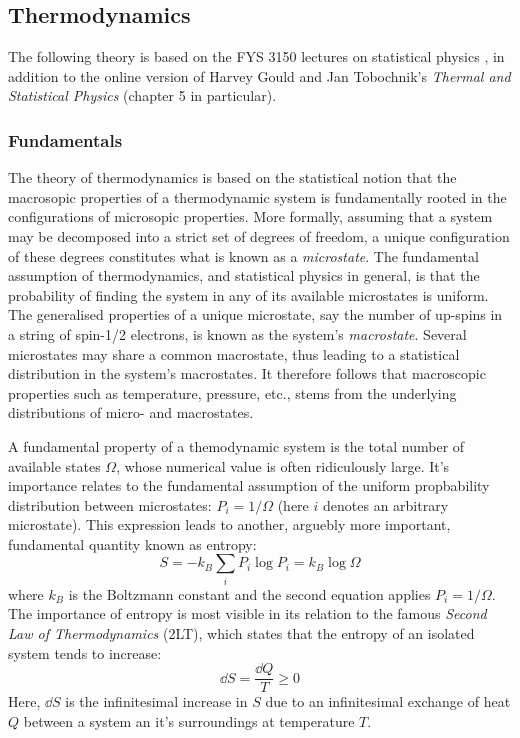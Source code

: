 \documentclass[nofootinbib,reprint,english]{revtex4-1}
\begin{document}
\subsection{Thermodynamics}
The following theory is based on the FYS 3150 lectures on statistical physics \cite{statphys}, in addition to the online version of Harvey Gould and Jan Tobochnik's \emph{Thermal and Statistical Physics} \cite{thermal_and_stat} (chapter 5 in particular).
\subsubsection{Fundamentals}
The theory of thermodynamics is based on the statistical notion that the macrosopic properties of a thermodynamic system is fundamentally rooted in the configurations of microsopic properties. More formally, assuming that a system may be decomposed into a strict set of degrees of freedom, a unique configuration of these degrees constitutes what is known as a \emph{microstate}. The fundamental assumption of thermodynamics, and statistical physics in general, is that the probability of finding the system in any of its available microstates is uniform. The generalised properties of a unique microstate, say the number of up-spins in a string of spin-1/2 electrons, is known as the system's \emph{macrostate}. Several microstates may share a common macrostate, thus leading to a statistical distribution in the system's macrostates. It therefore follows that macroscopic properties such as temperature, pressure, etc., stems from the underlying distributions of micro- and macrostates.

A fundamental property of a themodynamic system is the total number of available states \(\Omega\), whose numerical value is often ridiculously large.  It's importance relates to the fundamental assumption of the uniform propbability distribution between microstates: \(P_i=1/\Omega\) (here \(i\) denotes an arbitrary microstate). This expression leads to another, arguebly more important, fundamental quantity known as entropy:
\begin{equation}\label{eq:Entropy}
S=-k_B\sum_iP_i\log P_i=k_B\log\Omega
\end{equation}
where \(k_B\) is the Boltzmann constant and the second equation applies \(P_i=1/\Omega\). The importance of entropy is most visible in its relation to the famous \emph{Second Law of Thermodynamics} (2LT), which states that the entropy of an isolated system tends to increase:
\begin{equation}\label{eq:Second_Law_of_Thermodynamics}
\dd{S}=\frac{\dd{Q}}{T}\geq0
\end{equation}
Here, \(\dd{S}\) is the infinitesimal increase in \(S\) due to an infinitesimal exchange of heat \(Q\) between a system an it's surroundings at temperature \(T\).
\end{document}
